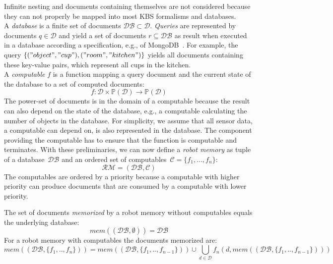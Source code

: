   Infinite nesting and
documents containing themselves are not considered because they can
not properly be mapped into most KBS formalisms and databases.
\\
A \emph{database} is a finite set of documents $\mathcal{DB} \subset \mathcal{D}$.
\emph{Queries} are represented by documents $q\in\mathcal{D}$ and
yield a set of documents $r\subseteq\mathcal{DB}$ as result when
executed in a database according a specification, e.g., of
MongoDB~\cite{mongodb}. For example, the query
$\{("object","cup"),("room","kitchen")\}$ yields all documents
containing these key-value pairs, which represent all cups in the
kitchen.
\\
A \emph{computable} $f$ is a function mapping a query document and
the current state of the database to a set of computed documents:
$$f: \mathcal{D}\times\mathbb{P}(\mathcal{D}) \rightarrow \mathbb{P}(\mathcal{D})$$
The power-set of documents is in the domain of a computable because the
result can also depend on the state of the database, e.g., a computable
calculating the number of objects in the database. For simplicity, we
assume that all sensor data, a computable can depend on, is also
represented in the database. The component providing the computable
has to ensure that the function is computable and terminates.
%
With these preliminaries, we can now define a \emph{robot memory} as tuple
of a database~$\mathcal{DB}$ and an ordered set of computables~$\mathcal{C}=\{f_1,...,f_n\}$:
$$\mathcal{RM}=(\mathcal{DB},\mathcal{C})$$
%
The computables are ordered by a priority because a computable with
higher priority can produce documents that are consumed by a computable
with lower priority.

The set of documents \emph{memorized} by a
robot memory without computables equals the underlying database:
$$mem(\mathcal{(DB,\emptyset)})=\mathcal{DB}$$
For a robot memory with computables the documents memorized are:
$$mem((\mathcal{DB},\{f_1,..,f_n\}))=mem((\mathcal{DB},\{f_1,..,f_{n-1}\})) \cup \bigcup_{d\in\mathcal{D}}f_n(d,mem((\mathcal{DB},\{f_1,..,f_{n-1}\})))$$

